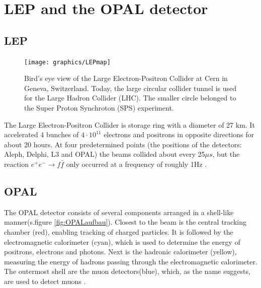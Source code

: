 \section{LEP and the OPAL detector}
\subsection{LEP}
\begin{figure}[ht]
	\centering
	\texttt{[image: graphics/LEPmap]}
	\caption[Bird's eye view LEP]{Bird's eye view of the Large Electron-Positron Collider at Cern in Geneva, Switzerland. Today, the large circular collider tunnel is used for the Large Hadron Collider (LHC). The smaller circle belonged to the Super Proton Synchroton (SPS) experiment. \cite{jakobs}}
	\label{fig:LEPmap}
\end{figure}
The Large Electron-Positron Collider is storage ring with a diameter of 27 km. It accelerated 4 bunches of $4\cdot 10^{11}$ electrons and positrons in opposite directions for about 20 hours. At four predetermined points (the positions of the detectors: Aleph, Delphi, L3 and OPAL) the beams collided about every 25$\mu s$, but the reaction $e^+ e^- \rightarrow f \bar{f}$ only occurred at a frequency of roughly 1Hz \cite{muenchen}.

\subsection{OPAL}
The OPAL detector consists of several components arranged in a shell-like manner(s.figure \ref{fig:OPALaufbau}). Closest to the beam is the central tracking chamber (red), enabling tracking of charged particles. It is followed by the electromagnetic calorimeter (cyan), which is used to determine the energy of positrons, electrons and photons.
Next is the hadronic calorimeter (yellow), measuring the energy of hadrons passing through the electromagnetic calorimeter.
The outermost shell are the muon detectors(blue), which, as the name suggests, are used to detect muons \cite{cern}.\\

